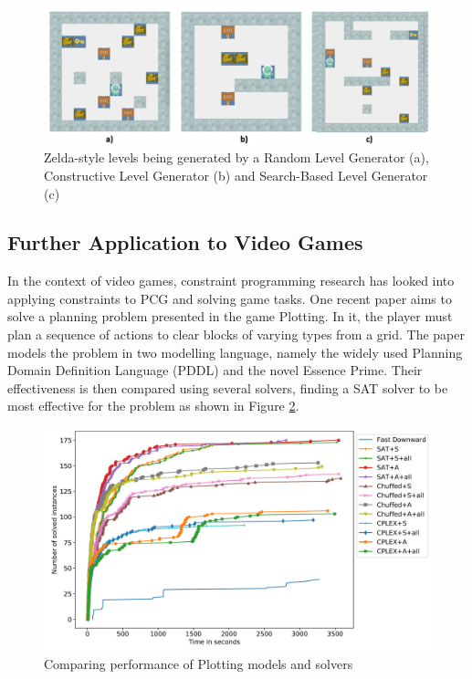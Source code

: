\begin{figure}[H]
    \centering
    \includegraphics[width=\textwidth, height=0.3\textheight, keepaspectratio]{Images/GVGAILevels.png}
    \caption{Zelda-style levels being generated by a Random Level Generator (a), Constructive Level Generator (b) and Search-Based Level Generator (c) \cite{GVG-AI_and_VGDL_Level_Generators}}
    \label{fig:gvgAILevels}
\end{figure}

\subsection{Further Application to Video Games}
In the context of video games, constraint programming research has looked into applying constraints to PCG and solving game tasks. One recent paper \cite{Plotting_Planning_Problem} aims to solve a planning problem presented in the game Plotting. In it, the player must plan a sequence of actions to clear blocks of varying types from a grid. The paper models the problem in two modelling language, namely the widely used Planning Domain Definition Language (PDDL) and the novel Essence Prime. Their effectiveness is then compared using several solvers, finding a SAT solver to be most effective for the problem as shown in Figure \ref{fig:plottingSolverComparison}.

\begin{figure}[H]
    \centering
    \includegraphics[width=\textwidth, height=0.3\textheight, keepaspectratio]{Images/PlottingSolverComparison.png}
    \caption{Comparing performance of Plotting models and solvers  \cite{Plotting_Planning_Problem}}
    \label{fig:plottingSolverComparison}
\end{figure}

